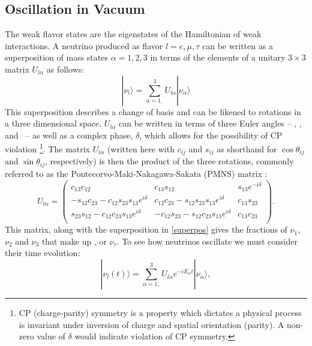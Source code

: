 \subsection{Oscillation in Vacuum}

The weak flavor states are the eigenstates of the Hamiltonian of
weak interactions.
A neutrino produced as flavor $l = e, \mu, \tau$ can be written as a
superposition of mass states $\alpha = 1, 2, 3$ in terms of the elements of a
unitary $3\times3$ matrix $U_{l\alpha}$ as follows:
\begin{equation}\label{superpos}
|\nu_l \rangle = \sum_{\alpha = 1,}^3 U_{l\alpha}|\nu_\alpha \rangle
\end{equation} %
This superposition describes a change of basis and can be likened to rotations
in a three dimensional space.
$U_{l\alpha}$ can be written in terms of three Euler angles --
\thetaot, \thetatth, and \thetaoth ~-- as well as a complex phase, $\delta$,
which allows for the possibility of CP violation
\footnote{CP (charge-parity) symmetry is a property which dictates a physical
process is invariant under inversion of charge and spatial orientation (parity).
A non-zero value of $\delta$ would indicate violation of CP symmetry\cite{ho2010elementary}.}.
The matrix $U_{l\alpha}$ (written here with $c_{ij}$ and $s_{ij}$ as shorthand
for
$\cos{\theta_{ij}}$ and $\sin{\theta_{ij}}$, respectively) is then the product
of the three rotations, commonly referred to as the
Pontecorvo-Maki-Nakagawa-Sakata (PMNS) matrix \cite{ho2010elementary}:
\begin{equation}
 U_{l\alpha} = \begin{pmatrix} \label{pmns}
c_{13}c_{12}              &    c_{13}s_{12}        &    s_{13} e^{-i\delta} \\
-s_{12}c_{23} - c_{12}s_{23}s_{13}e^{i\delta} & c_{12}c_{23} - s_{12}s_{23}s_{13}e^{i\delta}        &     c_{13}s_{23}  \\
s_{23}s_{12} - c_{12}c_{23}s_{13}e^{i\delta}  & -c_{12}s_{23} - s_{12}c_{23}s_{13}e^{i\delta}         &     c_{13}c_{23}  \\
\end{pmatrix}.
\end{equation}
This matrix, along with the superposition in \eqref{superpos} gives the
fractions of $\nu_1$, $\nu_2$ and $\nu_3$ that make up \nue, \numu or
$\nu_\tau$.
To see how neutrinos oscillate we must consider their time evolution:
\begin{equation}\label{evolve}
|\nu_l(t) \rangle = \sum_{\alpha = 1,}^3 U_{l\alpha}e^{-iE_\alpha t}|\nu_\alpha \rangle,
\end{equation}
